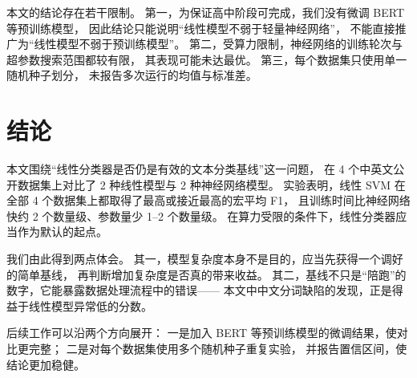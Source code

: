 \documentclass[11pt, a4paper]{ctexart}
\begin{document}
本文的结论存在若干限制。
第一，为保证高中阶段可完成，我们没有微调 BERT 等预训练模型，
因此结论只能说明“线性模型不弱于轻量神经网络”，
不能直接推广为“线性模型不弱于预训练模型”。
第二，受算力限制，神经网络的训练轮次与超参数搜索范围都较有限，
其表现可能未达最优。
第三，每个数据集只使用单一随机种子划分，
未报告多次运行的均值与标准差。

\section{结论}

本文围绕“线性分类器是否仍是有效的文本分类基线”这一问题，
在 4 个中英文公开数据集上对比了 2 种线性模型与 2 种神经网络模型。
实验表明，线性 SVM 在全部 4 个数据集上都取得了最高或接近最高的宏平均 F1，
且训练时间比神经网络快约 2 个数量级、参数量少 1--2 个数量级。
在算力受限的条件下，线性分类器应当作为默认的起点。

我们由此得到两点体会。
其一，模型复杂度本身不是目的，应当先获得一个调好的简单基线，
再判断增加复杂度是否真的带来收益。
其二，基线不只是“陪跑”的数字，它能暴露数据处理流程中的错误——
本文中中文分词缺陷的发现，正是得益于线性模型异常低的分数。

后续工作可以沿两个方向展开：
一是加入 BERT 等预训练模型的微调结果，使对比更完整；
二是对每个数据集使用多个随机种子重复实验，
并报告置信区间，使结论更加稳健。



\end{document}
